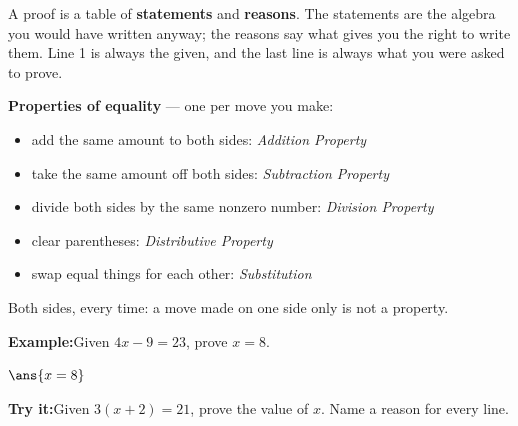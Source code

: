 \documentclass[12pt]{article}
\begin{document}

\noindent\small A proof is a table of \textbf{statements} and
\textbf{reasons}. The statements are the algebra you would have written anyway;
the reasons say what gives you the right to write them. Line 1 is always the
given, and the last line is always what you were asked to prove.
\normalsize

\begin{formulabox}
\textbf{Properties of equality} --- one per move you make:
\begin{itemize}[leftmargin=1.2cm, itemsep=0pt, topsep=2pt]
  \item add the same amount to both sides: \emph{Addition Property}
  \item take the same amount off both sides: \emph{Subtraction Property}
  \item divide both sides by the same nonzero number: \emph{Division Property}
  \item clear parentheses: \emph{Distributive Property}
  \item swap equal things for each other: \emph{Substitution}
\end{itemize}
Both sides, every time: a move made on one side only is not a property.
\end{formulabox}
\begin{examplebox}
\textbf{Example:}\quad Given $4x - 9 = 23$, prove $x = 8$.
\par
$\ans{x = 8}$
\end{examplebox}
\begin{tryitbox}
\textbf{Try it:}\quad Given $3(x + 2) = 21$, prove the value of $x$. Name a
reason for every line.\\[2pt]
\end{tryitbox}
\end{document}
